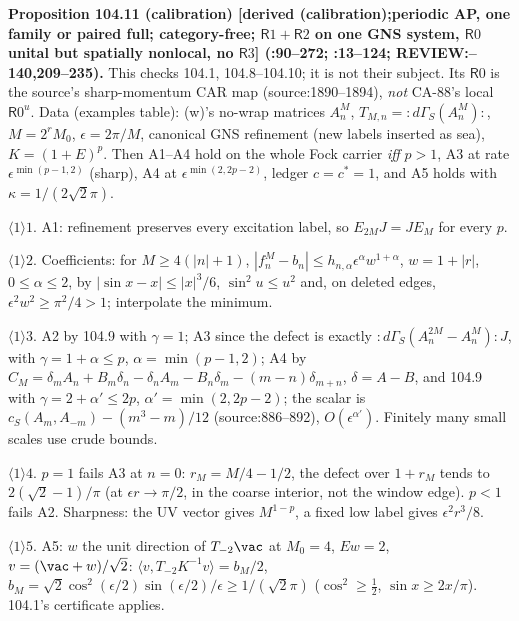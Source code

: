 \textbf{Proposition 104.11 (calibration) [derived (calibration);\newline periodic AP, one family or paired full; category-free; \(\mathsf R1+\mathsf R2\) on one GNS system,
\(\mathsf R0\) unital but spatially nonlocal, no \(\mathsf R3\)] (:90--272; :13--124; REVIEW:--140,209--235).}
This checks 104.1, 104.8--104.10; it is not their subject. Its \(\mathsf R0\) is the source's sharp-momentum CAR map
(source:1890--1894), \emph{not} CA-88's local \(\mathsf R0^u\). Data (examples table): (w)'s no-wrap matrices \(A_n^M\),
\(T_{M,n}={:}d\Gamma_S(A_n^M){:}\), \(M=2^rM_0\), \(\epsilon=2\pi/M\), canonical GNS refinement (new labels inserted as sea),
\(K=(1+E)^p\). Then A1--A4 hold on the whole Fock carrier \emph{iff} \(p>1\), A3 at rate \(\epsilon^{\min(p-1,2)}\) (sharp), A4 at
\(\epsilon^{\min(2,2p-2)}\), ledger \(c=c^*=1\), and A5 holds with \(\kappa=1/(2\sqrt2\pi)\).
\par\(\langle1\rangle1\). A1: refinement preserves every excitation label, so \(E_{2M}J=JE_M\) for every \(p\).
\par\(\langle1\rangle2\). Coefficients: for \(M\ge4(|n|+1)\), \(|f_n^M-b_n|\le h_{n,\alpha}\epsilon^\alpha w^{1+\alpha}\), \(w=1+|r|\), \(0\le\alpha\le2\), by
\(|\sin x-x|\le|x|^3/6\), \(\sin^2u\le u^2\) and, on deleted edges, \(\epsilon^2w^2\ge\pi^2/4>1\); interpolate the minimum.
\par\(\langle1\rangle3\). A2 by 104.9 with \(\gamma=1\); A3 since the defect is exactly \({:}d\Gamma_S(A^{2M}_n-A^M_n){:}J\), with \(\gamma=1+\alpha\le p\), \(\alpha=\min(p-1,2)\);
A4 by \(C_M=\delta_mA_n+B_m\delta_n-\delta_nA_m-B_n\delta_m-(m-n)\delta_{m+n}\), \(\delta=A-B\), and 104.9 with \(\gamma=2+\alpha'\le2p\), \(\alpha'=\min(2,2p-2)\);
the scalar is \(c_S(A_m,A_{-m})-(m^3-m)/12\) (source:886--892), \(O(\epsilon^{\alpha'})\). Finitely many small scales use crude bounds.
\par\(\langle1\rangle4\). \(p=1\) fails A3 at \(n=0\): \(r_M=M/4-1/2\), the defect over \(1+r_M\) tends to \(2(\sqrt2-1)/\pi\) (at
\(\epsilon r\to\pi/2\), in the coarse interior, not the window edge). \(p<1\) fails A2. Sharpness: the UV vector gives
\(M^{1-p}\), a fixed low label gives \(\epsilon^2r^3/8\).
\par\(\langle1\rangle5\). A5: \(w\) the unit direction of \(T_{-2}\vac\) at \(M_0=4\), \(Ew=2\), \(v=(\vac+w)/\sqrt2\): \(\langle v,T_{-2}K^{-1}v\rangle=b_M/2\),
\(b_M=\sqrt2\cos^2(\epsilon/2)\sin(\epsilon/2)/\epsilon\ge1/(\sqrt2\pi)\) (\(\cos^2\ge\tfrac12\), \(\sin x\ge2x/\pi\)). 104.1's certificate applies.
